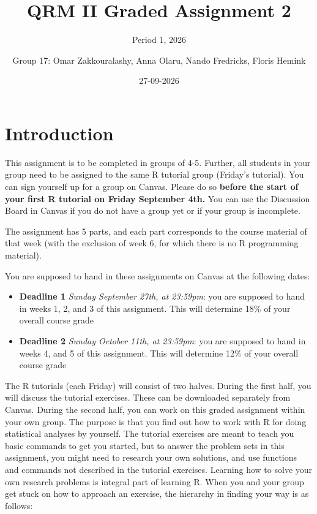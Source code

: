 \documentclass[
]{article}
\title{QRM II Graded Assignment 2}
\subtitle{Period 1, 2026}
\author{Group 17: Omar Zakkouralashy, Anna Olaru, Nando Fredricks,
Floris Hemink}
\date{27-09-2026}
\providecommand{\tightlist}{%
  \setlength{\itemsep}{0pt}\setlength{\parskip}{0pt}}
\begin{document}
\maketitle

\section{Introduction}\label{introduction}

This assignment is to be completed in groups of 4-5. Further, all
students in your group need to be assigned to the same R tutorial group
(Friday's tutorial). You can sign yourself up for a group on Canvas.
Please do so
\textbf{before the start of your first R tutorial on Friday September 4th.}
You can use the Discussion Board in Canvas if you do not have a group
yet or if your group is incomplete.

The assignment has 5 parts, and each part corresponds to the course
material of that week (with the exclusion of week 6, for which there is
no R programming material).

You are supposed to hand in these assignments on Canvas at the following
dates:

\begin{itemize}
\tightlist
\item
  \textbf{Deadline 1} \emph{Sunday September 27th, at 23:59pm}: you are
  supposed to hand in weeks 1, 2, and 3 of this assignment. This will
  determine 18\% of your overall course grade
\item
  \textbf{Deadline 2} \emph{Sunday October 11th, at 23:59pm}: you are
  supposed to hand in weeks 4, and 5 of this assignment. This will
  determine 12\% of your overall course grade
\end{itemize}

The R tutorials (each Friday) will consist of two halves. During the
first half, you will discuss the tutorial exercises. These can be
downloaded separately from Canvas. During the second half, you can work
on this graded assignment within your own group. The purpose is that you
find out how to work with R for doing statistical analyses by yourself.
The tutorial exercises are meant to teach you basic commands to get you
started, but to answer the problem sets in this assignment, you might
need to research your own solutions, and use functions and commands not
described in the tutorial exercises. Learning how to solve your own
research problems is integral part of learning R. When you and your
group get stuck on how to approach an exercise, the hierarchy in finding
your way is as follows:
\end{document}
